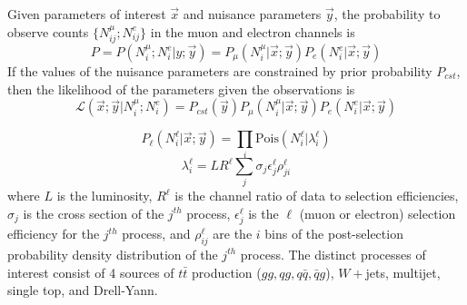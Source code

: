 \documentclass{article}
\newcommand{\lik}{\mathcal{L}}
\newcommand{\interest}{\vec{x}}
\newcommand{\nuis}{\vec{y}}
\begin{document}
Given parameters of interest $\interest$ and nuisance parameters
$\nuis$, the probability to observe counts $\{N_{ij}^{\mu};N_{ij}^e\}$
in the muon and electron channels is
\[P 
= P\left(N_i^{\mu};N_i^e | y;\nuis\right) =
P_{\mu}\left(N_i^{\mu}|\interest;\nuis\right)P_e\left(N_i^e|\interest;\nuis\right)\]
If the values of the nuisance parameters are constrained by prior
probability $P_{cst}$, then the likelihood of the parameters given the
observations is
\begin{equation}
  \lik\left(\interest;\nuis|N_i^{\mu};N_i^e\right) = P_{cst}(\nuis)P_{\mu}(N_i^\mu|\interest;\nuis)P_e(N_i^e|\interest;\nuis)
\end{equation}


\begin{equation}
  P_\ell\left(N_i^\ell|\interest;\nuis\right) = \prod_i \mathrm{Pois}\left(N_i^\ell|\lambda_i^\ell\right)
\end{equation}
\begin{equation}
  \lambda_i^\ell = LR^\ell\sum_j\sigma_j\epsilon_j^\ell\rho_{ji}^\ell
\end{equation}
where $L$ is the luminosity, $R^\ell$ is the channel ratio of data to
selection efficiencies, $\sigma_j$ is the cross section of the
$j^{th}$ process, $\epsilon^\ell_j$ is the $\ell$ (muon or electron)
selection efficiency for the $j^{th}$ process, and $\rho^\ell_{ij}$
are the $i$ bins of the post-selection probability density
distribution of the $j^{th}$ process.  The distinct processes of
interest consist of 4 sources of $t\bar{t}$ production
($gg,qg,q\bar{q},\bar{q}g$), $W+$jets, multijet, single top, and
Drell-Yann.
\end{document}
